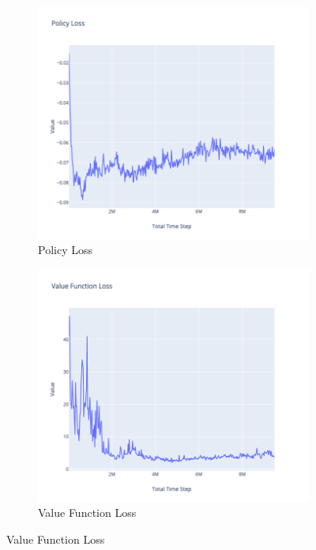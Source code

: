 \begin{figure}[!htb]
		\begin{subfigure}[!htb]{0.35\textwidth}
				\centering
				\includegraphics[width=\textwidth]{figures/exps/1st_exp/policy_loss}
				\caption{Policy Loss}
				\label{fig:policy_loss}
		\end{subfigure}
		\hfill
		\begin{subfigure}[!htb]{0.35\textwidth}
				\centering
				\includegraphics[width=\textwidth]{figures/exps/1st_exp/vf_loss}
				\caption{Value Function Loss}
				\label{fig:vf_loss}
		\end{subfigure}
		\hfill


\end{figure}
